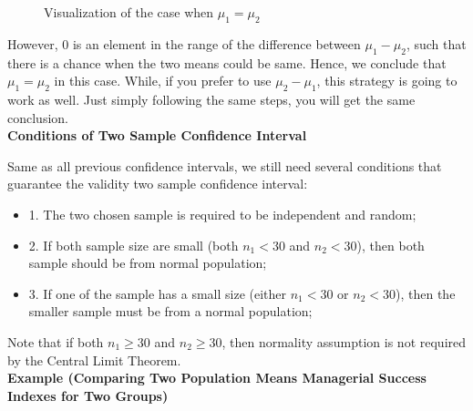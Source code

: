 \begin{center}
\begin{figure}
\caption{Visualization of the case when $\mu_1 = \mu_2$}
\end{figure}
\vspace{0.5em}
\end{center}

However, 0 is an element in the range of the difference between $\mu_1 - \mu_2$, such that there is a chance when the two means could be same. Hence, we conclude that $\mu_1 = \mu_2$ in this case. While, if you prefer to use $\mu_2 - \mu_1$, this strategy is going to work as well. Just simply following the same steps, you will get the same conclusion.\\

\textbf{Conditions of Two Sample Confidence Interval}

Same as all previous confidence intervals, we still need several conditions that guarantee the validity two sample confidence interval:

\begin{itemize}
	\item 1. The two chosen sample is required to be independent and random;
	\item 2. If both sample size are small (both $n_1 < 30$ and $n_2 < 30$), then both sample should be from normal population;
	\item 3. If one of the sample has a small size (either $n_1 < 30$ or $n_2 < 30$), then the smaller sample must be from a normal population;
\end{itemize}

Note that if both $n_1 \ge 30$ and $n_2 \ge 30$, then normality assumption is not required by the Central Limit Theorem.\\

\textbf{Example (Comparing Two Population Means Managerial Success Indexes for Two Groups)}

